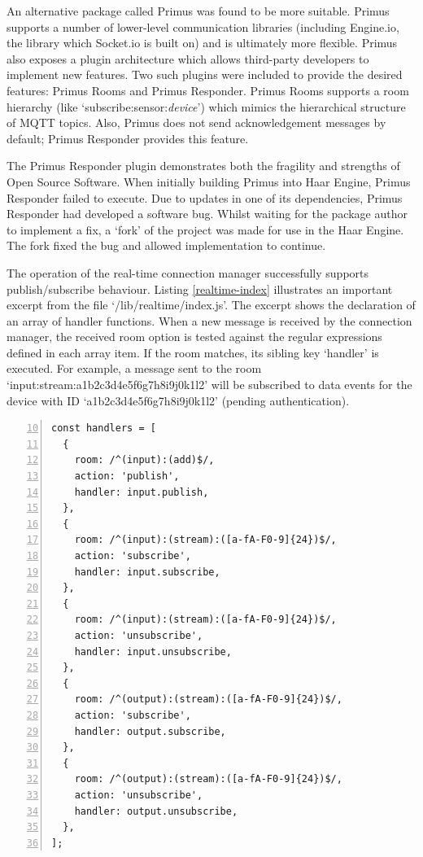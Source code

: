       An alternative package called Primus was found to be more suitable. Primus supports a number of lower-level communication libraries (including Engine.io, the library which Socket.io is built on) and is ultimately more flexible. Primus also exposes a plugin architecture which allows third-party developers to implement new features. Two such plugins were included to provide the desired features: Primus Rooms and Primus Responder. Primus Rooms supports a room hierarchy (like `subscribe:sensor:\textit{device}') which mimics the hierarchical structure of MQTT topics. Also, Primus does not send acknowledgement messages by default; Primus Responder provides this feature.

      The Primus Responder plugin demonstrates both the fragility and strengths of Open Source Software. When initially building Primus into Haar Engine, Primus Responder failed to execute. Due to updates in one of its dependencies, Primus Responder had developed a software bug. Whilst waiting for the package author to implement a fix, a `fork' of the project was made for use in the Haar Engine. The fork fixed the bug and allowed implementation to continue.

      The operation of the real-time connection manager successfully supports publish/subscribe behaviour. Listing \ref{realtime-index} illustrates an important excerpt from the file `/lib/realtime/index.js'. The excerpt shows the declaration of an array of handler functions. When a new message is received by the connection manager, the received room option is tested against the regular expressions defined in each array item. If the room matches, its sibling key `handler' is executed. For example, a message sent to the room `input:stream:a1b2c3d4e5f6g7h8i9j0k1l2' will be subscribed to data events for the device with ID `a1b2c3d4e5f6g7h8i9j0k1l2' (pending authentication).

      \begin{lstlisting}[caption=Excerpt from `/lib/realtime/index.js',
        label=realtime-index,
        captionpos=b,
        numbers=left,
        frame=single,
        firstnumber=10,
        float,
        upquote=true]
const handlers = [
  {
    room: /^(input):(add)$/,
    action: 'publish',
    handler: input.publish,
  },
  {
    room: /^(input):(stream):([a-fA-F0-9]{24})$/,
    action: 'subscribe',
    handler: input.subscribe,
  },
  {
    room: /^(input):(stream):([a-fA-F0-9]{24})$/,
    action: 'unsubscribe',
    handler: input.unsubscribe,
  },
  {
    room: /^(output):(stream):([a-fA-F0-9]{24})$/,
    action: 'subscribe',
    handler: output.subscribe,
  },
  {
    room: /^(output):(stream):([a-fA-F0-9]{24})$/,
    action: 'unsubscribe',
    handler: output.unsubscribe,
  },
];
      \end{lstlisting}


